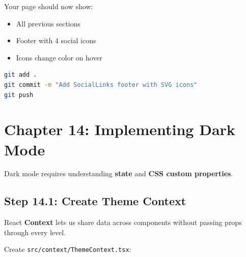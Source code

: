 \documentclass[12pt,a4paper]{article}
\begin{document}
\begin{checkpoint}
Your page should now show:
\begin{itemize}
    \item[$\square$] All previous sections
    \item[$\square$] Footer with 4 social icons
    \item[$\square$] Icons change color on hover
\end{itemize}
\end{checkpoint}

\begin{gitcommit}
\begin{lstlisting}[language=bash]
git add .
git commit -m "Add SocialLinks footer with SVG icons"
git push
\end{lstlisting}
\end{gitcommit}

\section{Chapter 14: Implementing Dark Mode}

Dark mode requires understanding \textbf{state} and \textbf{CSS custom properties}.

\subsection{Step 14.1: Create Theme Context}

React \textbf{Context} lets us share data across components without passing props through every level.

Create \texttt{src/context/ThemeContext.tsx}:
\end{document}

